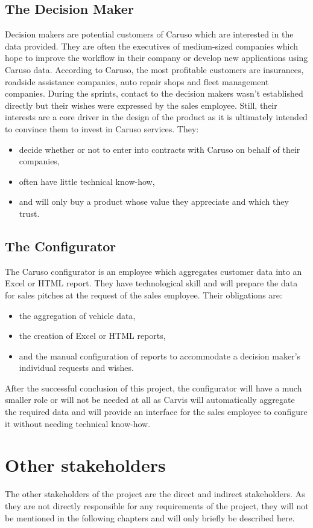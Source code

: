 \subsection{The Decision Maker}
Decision makers are potential customers of Caruso which are interested in the data provided. They are often the executives of medium-sized companies which hope to improve the workflow in their company or develop new applications using Caruso data. According to Caruso, the most profitable customers are insurances, roadside assistance companies, auto repair shops and fleet management companies. During the \glspl{sprint}, contact to the decision makers wasn't established directly but their wishes were expressed by the sales employee. Still, their interests are a core driver in the design of the product as it is ultimately intended to convince them to invest in Caruso services. They:
\begin{itemize}
  \item decide whether or not to enter into contracts with Caruso on behalf of their companies,
  \item often have little technical know-how,
  \item and will only buy a product whose value they appreciate and which they trust.
\end{itemize}

\subsection{The Configurator}
The Caruso configurator is an employee which aggregates customer data into an Excel or HTML report. They have technological skill and will prepare the data for sales pitches at the request of the sales employee. Their obligations are:
\begin{itemize}
  \item the aggregation of vehicle data,
  \item the creation of Excel or HTML reports,
  \item and the manual configuration of reports to accommodate a decision maker's individual requests and wishes.
\end{itemize}
After the successful conclusion of this project, the configurator will have a much smaller role or will not be needed at all as Carvis will automatically aggregate the required data and will provide an interface for the sales employee to configure it without needing technical know-how.

\section{Other \Glspl{stakeholder}}
The other \glspl{stakeholder} of the project are the direct and indirect \glspl{stakeholder}. As they are not directly responsible for any requirements of the project, they will not be mentioned in the following chapters and will only briefly be described here.

